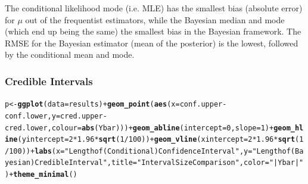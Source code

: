 \documentclass[AMA,STIX1COL]{WileyNJD-v2}\usepackage[]{graphicx}\usepackage[]{color}
\makeatletter
\newcommand{\hlnum}[1]{\textcolor[rgb]{0.686,0.059,0.569}{#1}}%
\newcommand{\hlstr}[1]{\textcolor[rgb]{0.192,0.494,0.8}{#1}}%
\newcommand{\hlopt}[1]{\textcolor[rgb]{0,0,0}{#1}}%
\newcommand{\hlstd}[1]{\textcolor[rgb]{0.345,0.345,0.345}{#1}}%
\newcommand{\hlkwb}[1]{\textcolor[rgb]{0.69,0.353,0.396}{#1}}%
\newcommand{\hlkwc}[1]{\textcolor[rgb]{0.333,0.667,0.333}{#1}}%
\newcommand{\hlkwd}[1]{\textcolor[rgb]{0.737,0.353,0.396}{\textbf{#1}}}%
\newenvironment{kframe}{%
 \def\at@end@of@kframe{}%
 \ifinner\ifhmode%
  \def\at@end@of@kframe{\end{minipage}}%
  \begin{minipage}{\columnwidth}%
 \fi\fi%
 \def\FrameCommand##1{\hskip\@totalleftmargin \hskip-\fboxsep
 \colorbox{shadecolor}{##1}\hskip-\fboxsep
     \hskip-\linewidth \hskip-\@totalleftmargin \hskip\columnwidth}%
 \MakeFramed {\advance\hsize-\width
   \@totalleftmargin\z@ \linewidth\hsize
   \@setminipage}}%
 {\par\unskip\endMakeFramed%
 \at@end@of@kframe}
\newenvironment{knitrout}{}{} %
\makeatother
\begin{document}
\begin{figure}
\begin{knitrout}
\end{knitrout}
\end{figure}

The conditional likelihood mode (i.e. MLE) has the smallest bias (absolute error) for $\mu$ out of the frequentist estimators, while the Bayesian median and mode (which end up being the same) the smallest bias in the Bayesian framework. The RMSE for the Bayesian estimator (mean of the posterior) is the lowest, followed by the conditional mean and mode.

\subsubsection{Credible Intervals}

\begin{knitrout}
\color{fgcolor}\begin{kframe}
\begin{alltt}
\hlstd{p}\hlkwb{<-}\hlkwd{ggplot}\hlstd{(}\hlkwc{data} \hlstd{= results)}\hlopt{+} \hlkwd{geom_point}\hlstd{(}\hlkwd{aes}\hlstd{(}\hlkwc{x} \hlstd{= conf.upper}\hlopt{-}\hlstd{conf.lower,} \hlkwc{y} \hlstd{= cred.upper}\hlopt{-}\hlstd{cred.lower,} \hlkwc{colour} \hlstd{=} \hlkwd{abs}\hlstd{(Ybar)))}\hlopt{+}\hlkwd{geom_abline}\hlstd{(}\hlkwc{intercept} \hlstd{=} \hlnum{0}\hlstd{,} \hlkwc{slope} \hlstd{=} \hlnum{1}\hlstd{)}\hlopt{+}\hlkwd{geom_hline}\hlstd{(}\hlkwc{yintercept}\hlstd{=}\hlnum{2}\hlopt{*}\hlnum{1.96}\hlopt{*}\hlkwd{sqrt}\hlstd{(}\hlnum{1}\hlopt{/}\hlnum{100}\hlstd{))}\hlopt{+}\hlkwd{geom_vline}\hlstd{(}\hlkwc{xintercept}\hlstd{=}\hlnum{2}\hlopt{*}\hlnum{1.96}\hlopt{*}\hlkwd{sqrt}\hlstd{(}\hlnum{1}\hlopt{/}\hlnum{100}\hlstd{))}\hlopt{+}\hlkwd{labs}\hlstd{(}\hlkwc{x}\hlstd{=}\hlstr{"Length of (Conditional) Confidence Interval"}\hlstd{,}\hlkwc{y}\hlstd{=}\hlstr{"Length of (Bayesian) Credible Interval"}\hlstd{,} \hlkwc{title}\hlstd{=}\hlstr{"Interval Size Comparison"}\hlstd{,}\hlkwc{color}\hlstd{=}\hlstr{"|Ybar|"}\hlstd{)}\hlopt{+}\hlkwd{theme_minimal}\hlstd{()}
\end{alltt}
\end{kframe}
\end{knitrout}
\end{document}
